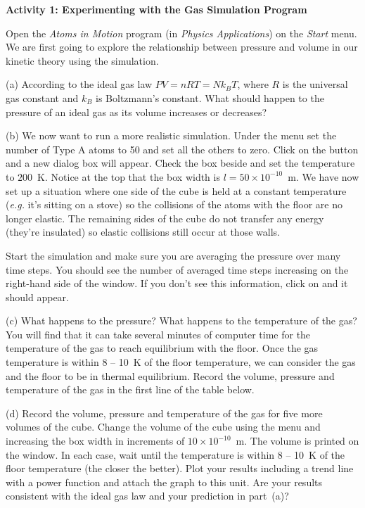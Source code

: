 \textbf{Activity 1: Experimenting with the Gas Simulation Program}

Open the {\it Atoms in Motion} program (in {\it Physics Applications}) on the {\it Start} menu.
We are first going to explore the relationship between pressure and volume in
our kinetic theory using the simulation. 

(a) According to the ideal gas law \( PV = nRT = Nk_{B}T \), where \( R \) is the universal gas constant and \( k_{B} \) is Boltzmann's constant. What
should happen to the pressure of an ideal gas as its volume increases
or decreases?
\vspace{1.0in}

(b) We now want to run a more realistic simulation.
Under the  menu set the number of Type A atoms to 50 and set all the others to zero.
Click on the  button and a new dialog box will appear.
Check the box beside  and set the temperature to $200$~K.
Notice at the top that the box width is $l=50 \times 10^{-10}$~m.
We have now set up a situation where one side of the cube is held at a constant
temperature (\textit{e.g.} it's sitting on a stove) so the collisions of the atoms with the
floor are no longer elastic.
The remaining sides of the
cube do not transfer any energy (they're insulated) so elastic collisions still occur 
at those walls.

Start
the simulation and make sure you are averaging the pressure over many time steps.
You should see the number of averaged time steps increasing on the right-hand side 
of the  window. 
If you don't see this information, click on  and it should appear.

\newpage

(c) What happens to the pressure?
What happens to the temperature of the gas? 
You will find that it can take several minutes of computer time for the temperature of the gas to reach equilibrium with the floor.
Once the gas temperature is within 8 -- 10~K of the floor temperature, we can consider the gas and the floor to be in thermal equilibrium. Record the volume, pressure and temperature of the gas in the first line of the table below.
\vspace{20mm}

(d) Record the volume, pressure and temperature of the gas for five more volumes of the cube. Change the volume of the cube using the  menu and 
increasing the box width in increments of $10 \times 10^{-10}$~m. The volume 
is printed on the  window. In each case, wait until the
temperature is within 8 -- 10~K of the floor temperature (the closer the better).
Plot your results including a trend line with a power function and attach the 
graph to this unit. Are your results consistent with the ideal gas law and
your prediction in part~(a)? 

